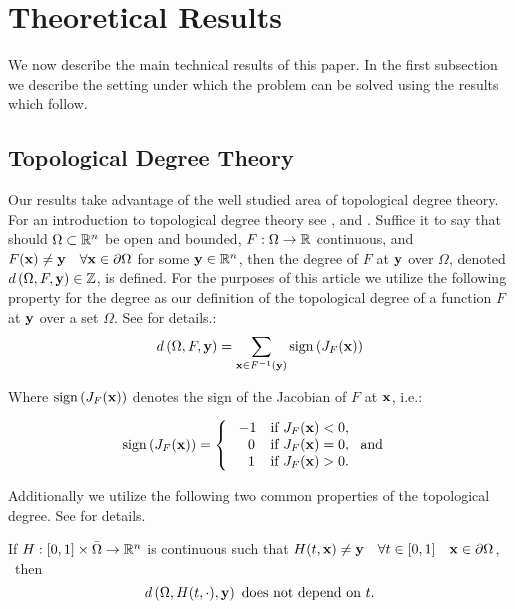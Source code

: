 \section{Theoretical Results} \label{sec:theory}  
We now describe the main technical results of this paper. 
In the first subsection we describe the setting under which the problem can be solved using the results which follow. 
\subsection{Topological Degree Theory}
Our results take advantage of the well studied area of topological degree theory. 
For an introduction to topological degree theory see \cite{OrChCh2006}, \cite{fonseca1995degree} and \cite{MoVrYa2002}. 
Suffice it to say that should $\Omega\subset\mathbb{R}^{n}$ be open and bounded, $F:\Omega\rightarrow \mathbb{R}$ continuous, and $F(\mathbf{x}) \neq \mathbf{y} \quad \forall \mathbf{x}\in\partial\Omega$ for some $\mathbf{y}\in\mathbb{R}^n$, then the degree of $F$ at $\mathbf{y}$ over $\Omega$, denoted $d\left(\Omega,F,\mathbf{y}\right)\in\mathbb{Z}$, is defined. 
For the purposes of this article we utilize the following property for the degree as our definition of the topological degree of a function $F$ at $\mathbf{y}$ over a set $\Omega$. 
See \cite{OrChCh2006} for details.:
\begin{equation}\label{eq:Deg3}
d\left(\Omega,F,\mathbf{y}\right)=\sum\limits_{\mathbf{x}\in F^{-1}(\mathbf{y})}\operatorname{sign}\left(J_F(\mathbf{x})\right)
\end{equation}

Where $\operatorname{sign}\left(J_F(\mathbf{x})\right)$ denotes the sign of the Jacobian of $F$ at $\mathbf{x}$, i.e.:

\[\operatorname{sign}\left(J_F(\mathbf{x})\right)=   \left\{
\begin{array}{ll}
       \ -1   & \mbox{if } J_F(\mathbf{x})< 0, \\
      \quad 0 & \mbox{if } J_F(\mathbf{x})= 0,~\mbox{ and } \\
      \quad 1 & \mbox{if } J_F(\mathbf{x})> 0. \\
\end{array} 
\right. \]

Additionally we utilize the following two common properties of the topological degree. 
See \cite{OrChCh2006} for details. 

If $H : [0,1]\times\bar{\Omega}\rightarrow\mathbb{R}^n$ is continuous such that $H(t,\mathbf{x})\neq \mathbf{y} \quad \forall t\in[0,1]\quad \mathbf{x}\in\partial\Omega$,   \ then 
\begin{equation}\label{eq:Deg1} 
d\left(\Omega,H(t,\cdot),\mathbf{y}\right)\text{ does not depend on }t.
\end{equation}

